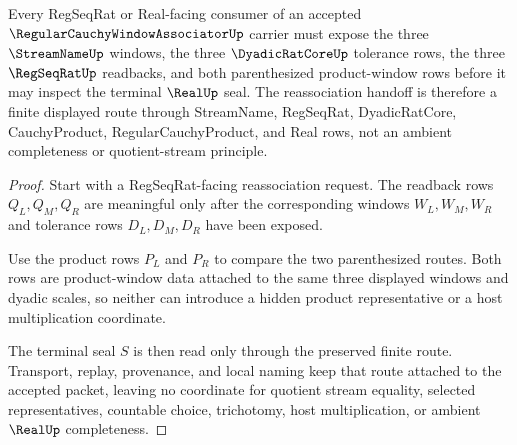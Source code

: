 \begin{theorem}
\label{thm:regular-cauchy-window-associator-regseqrat-handoff}
Every RegSeqRat or Real-facing consumer of an accepted $\RegularCauchyWindowAssociatorUp$ carrier must expose the three $\StreamNameUp$ windows, the three $\DyadicRatCoreUp$ tolerance rows, the three $\RegSeqRatUp$ readbacks, and both parenthesized product-window rows before it may inspect the terminal $\RealUp$ seal. The reassociation handoff is therefore a finite displayed route through StreamName, RegSeqRat, DyadicRatCore, CauchyProduct, RegularCauchyProduct, and Real rows, not an ambient completeness or quotient-stream principle.
\end{theorem}
\begin{proof}
Start with a RegSeqRat-facing reassociation request. The readback rows $Q_L,Q_M,Q_R$ are meaningful only after the corresponding windows $W_L,W_M,W_R$ and tolerance rows $D_L,D_M,D_R$ have been exposed.

Use the product rows $P_L$ and $P_R$ to compare the two parenthesized routes. Both rows are product-window data attached to the same three displayed windows and dyadic scales, so neither can introduce a hidden product representative or a host multiplication coordinate.

The terminal seal $S$ is then read only through the preserved finite route. Transport, replay, provenance, and local naming keep that route attached to the accepted packet, leaving no coordinate for quotient stream equality, selected representatives, countable choice, trichotomy, host multiplication, or ambient $\RealUp$ completeness.
\end{proof}




